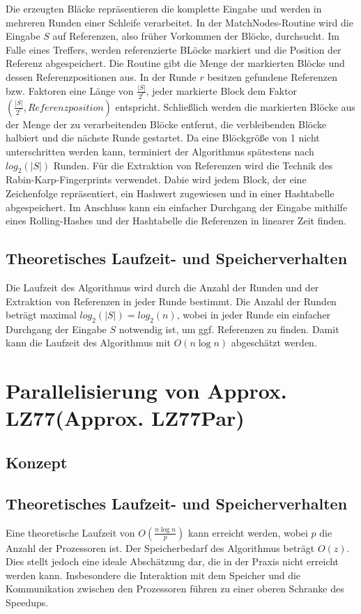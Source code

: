 Die erzeugten Bläcke repräsentieren die komplette Eingabe und werden in mehreren Runden einer Schleife verarbeitet. In der MatchNodes-Routine wird die Eingabe $S$ auf Referenzen, also
früher Vorkommen der Blöcke, durchsucht. Im Falle eines Treffers, werden referenzierte BLöcke markiert und die Position der Referenz abgespeichert. Die Routine gibt die Menge der 
markierten Blöcke und dessen Referenzpositionen aus. In der Runde $r$ besitzen gefundene Referenzen bzw. Faktoren eine Länge von $\frac{|S|}{2^r}$, jeder markierte Block dem Faktor 
$(\frac{|S|}{2^r}, Referenzposition)$ entspricht. Schließlich werden die markierten Blöcke aus der Menge der zu verarbeitenden Blöcke entfernt, die verbleibenden Blöcke halbiert und die nächste 
Runde gestartet. Da eine Blöckgröße von 1 nicht unterschritten werden kann, terminiert der Algorithmus spätestens nach $log_2(|S|)$ Runden. Für die Extraktion von Referenzen wird die Technik des 
Rabin-Karp-Fingerprints verwendet. Dabie wird jedem Block, der eine Zeichenfolge repräsentiert, ein Hashwert zugewiesen und in einer Hashtabelle abgespeichert. Im Anschluss kann ein einfacher
Durchgang der Eingabe mithilfe eines Rolling-Hashes und der Hashtabelle die Referenzen in linearer Zeit finden.
\subsection{Theoretisches Laufzeit- und Speicherverhalten}
Die Laufzeit des Algorithmus wird durch die Anzahl der Runden und der Extraktion von Referenzen in jeder Runde bestimmt. Die Anzahl der Runden beträgt maximal $log_2(|S|)=log_2(n)$, wobei in jeder Runde
ein einfacher Durchgang der Eingabe $S$ notwendig ist, um ggf. Referenzen zu finden. Damit kann die Laufzeit des Algorithmus mit $O(n \log n)$ abgeschätzt werden. 

\section{Parallelisierung von Approx. LZ77(Approx. LZ77Par)}
\subsection{Konzept}
\subsection{Theoretisches Laufzeit- und Speicherverhalten}
Eine theoretische Laufzeit von $O(\frac{n \log n}{p})$ kann erreicht werden, wobei $p$ die Anzahl der Prozessoren ist. Der Speicherbedarf des Algorithmus beträgt $O(z)$. Dies stellt jedoch eine
ideale Abschätzung dar, die in der Praxis nicht erreicht werden kann. Insbesondere die Interaktion mit dem Speicher und die Kommunikation zwischen den Prozessoren führen zu einer oberen Schranke
des Speedups.

